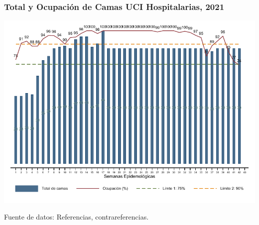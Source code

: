 \documentclass[xcolor=table]{beamer}
\begin{document}
	\begin{frame}[label=camas]
		\frametitle{Total y Ocupación de Camas UCI Hospitalarias, 2021}
		\vspace{-.2cm}
		\begin{center}
			\includegraphics[width=0.9\linewidth, trim={0cm .5cm 0cm 0.2cm},clip]{../figuras/uci.pdf}
			
		\begin{table}[]
		\end{table}
		\end{center}
		{\tiny Fuente de datos: Referencias, contrareferencias.}
	\end{frame}
	
\end{document}

